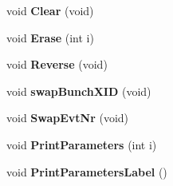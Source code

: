 \begin{DoxyCompactItemize}
\item 
void {\bfseries Clear} (void)\label{classLConverter_a9251a44afb49f1215749cb2e409beb6d}

\item 
void {\bfseries Erase} (int i)\label{classLConverter_a4966e1ffc3dd538c66336cf8d29fea22}

\item 
void {\bfseries Reverse} (void)\label{classLConverter_a308aa32941ea7dadb65354958ed26b6b}

\item 
void {\bfseries swap\-Bunch\-X\-I\-D} (void)\label{classLConverter_ac018aa0de8c404849ac58ba98232a7b2}

\item 
void {\bfseries Swap\-Evt\-Nr} (void)\label{classLConverter_a8d23856e6cd95500295bfc4f7decf252}

\item 
void {\bfseries Print\-Parameters} (int i)\label{classLConverter_adf37266688bb924ffe3ca72787115a17}

\item 
void {\bfseries Print\-Parameters\-Label} ()\label{classLConverter_a0ca415c8251400c2db08b8efeaeda600}

\end{DoxyCompactItemize}

